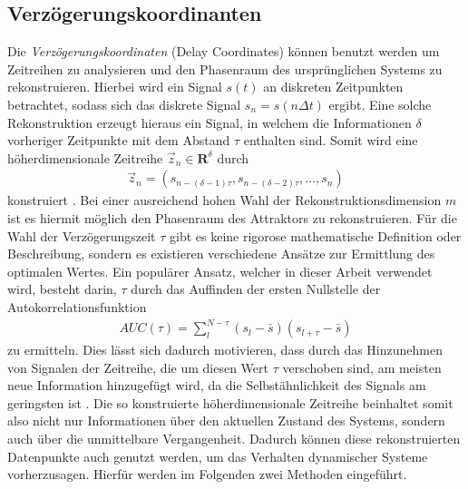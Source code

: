 \subsection{Verzögerungskoordinanten}
\label{sc:delay_reconstruction}
Die \textit{Verzögerungskoordinaten} (Delay Coordinates) können benutzt werden um Zeitreihen zu analysieren und den Phasenraum des ursprünglichen Systems zu rekonstruieren.
Hierbei wird ein Signal $s(t)$ an diskreten Zeitpunkten betrachtet, sodass sich das diskrete Signal $s_n = s(n\Delta t)$ ergibt. Eine solche Rekonstruktion erzeugt hieraus ein Signal, in welchem die Informationen $\delta$ vorheriger Zeitpunkte mit dem Abstand $\tau$ enthalten sind. Somit wird eine höherdimensionale Zeitreihe $\vec{z}_n \in \mathbf{R}^{\delta}$ durch
\begin{align}
	\vec{z}_n = \left(s_{n-(\delta-1)\tau}, s_{n-(\delta-2)\tau}, \ldots ,s_n \right)
\end{align} 
konstruiert \citep[35\,ff.]{kantz2004nonlinear}. Bei einer ausreichend hohen Wahl der Rekonstruktionsdimension $m$ ist es hiermit möglich den Phasenraum des Attraktors zu rekonstruieren. Für die Wahl der Verzögerungszeit $\tau$ gibt es keine rigorose mathematische Definition oder Beschreibung, sondern es existieren verschiedene Ansätze zur Ermittlung des optimalen Wertes. Ein populärer Ansatz, welcher in dieser Arbeit verwendet wird, besteht darin, $\tau$ durch das Auffinden der ersten Nullstelle der Autokorrelationsfunktion 
\begin{align}
AUC(\tau) = \sum_l^{N-\tau} (s_l-\bar{s})(s_{l+\tau}-\bar{s})
\end{align}   
zu ermitteln. Dies lässt sich dadurch motivieren, dass durch das Hinzunehmen von Signalen der Zeitreihe, die um diesen Wert $\tau$ verschoben sind, am meisten neue Information hinzugefügt wird, da die Selbstähnlichkeit des Signals am geringsten ist \citep[30\,ff.]{kantz2004nonlinear}.
Die so konstruierte höherdimensionale Zeitreihe beinhaltet somit also nicht nur Informationen über den aktuellen Zustand des Systems, sondern auch über die unmittelbare Vergangenheit. Dadurch können diese rekonstruierten Datenpunkte auch genutzt werden, um das Verhalten dynamischer Systeme vorherzusagen. Hierfür werden im Folgenden zwei Methoden eingeführt.